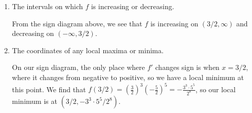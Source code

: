 \documentclass[12pt]{article}
\begin{document}
\begin{enumerate}
\begin{enumerate}
   \item The intervals on which $f$ is increasing or decreasing.
   
   \medskip
   
From the sign diagram above, we see that $f$ is increasing on $(3/2,\infty)$ and decreasing on $(-\infty,3/2)$.

\medskip
   
   \item The coordinates of any local maxima or minima.

\medskip

  On our sign diagram, the only place where $f'$ changes sign is when $x=3/2$, where it changes from negative to positive, so we have a local minimum at this point. We find that $f(3/2)=(\frac32)^3(-\frac52)^5=-\frac{3^3\cdot 5^5}{2^8}$, so our local minimum is at $(3/2, -3^3\cdot 5^5/2^8)$.
   \end{enumerate}
   

   
   
  \end{enumerate}
\end{document}
